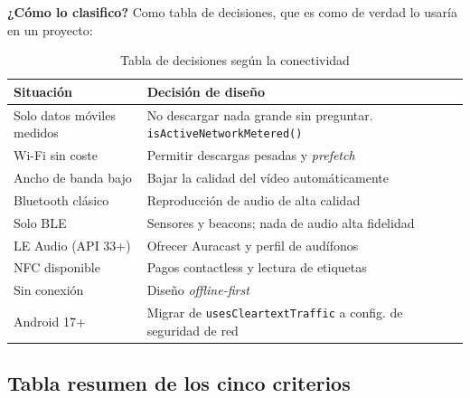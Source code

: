 \documentclass[11pt,a4paper]{article}
\newcommand{\code}[1]{\texttt{\color{ink}#1}}
\newcommand{\campo}[1]{\textbf{\color{ink}#1}}
\begin{document}
	\campo{¿Cómo lo clasifico?} Como tabla de decisiones, que es como de verdad lo usaría en un proyecto:
	
	\begin{table}[htbp]
		\centering
		\small
		\begin{tabularx}{\textwidth}{@{}>{\RaggedRight\arraybackslash}p{5cm} >{\RaggedRight\arraybackslash}X@{}}
			\toprule
			\rowcolor{primary}
			\textcolor{paper}{\sffamily\bfseries Situación} & \textcolor{paper}{\sffamily\bfseries Decisión de diseño} \\
			\midrule
			Solo datos móviles medidos & No descargar nada grande sin preguntar. \code{isActiveNetworkMetered()} \\
			\rowcolor{soft}
			Wi-Fi sin coste & Permitir descargas pesadas y \emph{prefetch} \\
			Ancho de banda bajo & Bajar la calidad del vídeo automáticamente \\
			\rowcolor{soft}
			Bluetooth clásico & Reproducción de audio de alta calidad \\
			Solo BLE & Sensores y beacons; nada de audio alta fidelidad \\
			\rowcolor{soft}
			LE Audio (API 33+) & Ofrecer Auracast y perfil de audífonos \\
			NFC disponible & Pagos contactless y lectura de etiquetas \\
			\rowcolor{soft}
			Sin conexión & Diseño \emph{offline-first} \\
			Android 17+ & Migrar de \code{usesCleartextTraffic} a config. de seguridad de red \\
			\bottomrule
		\end{tabularx}
		\caption{Tabla de decisiones según la conectividad}
	\end{table}
	
	\subsection{Tabla resumen de los cinco criterios}
	
\end{document}
